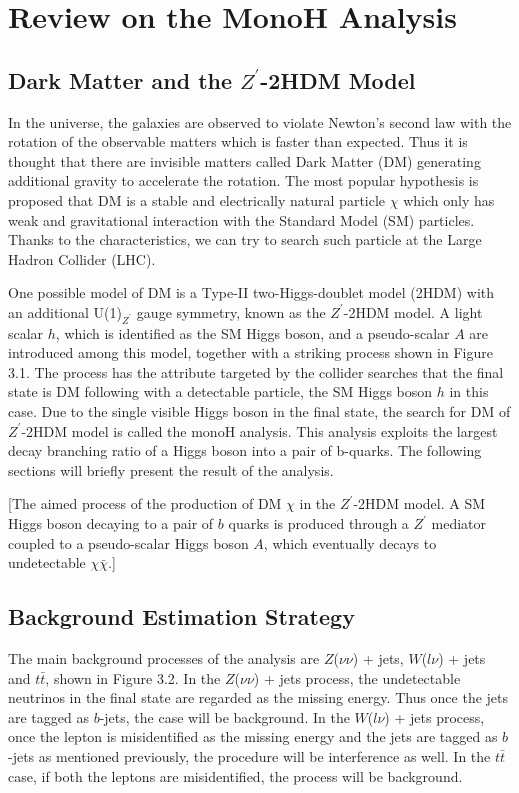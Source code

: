 \documentclass[class=NTHU_thesis, crop=false]{standalone}
\begin{document}
\chapter{Review on the MonoH Analysis}
\section{Dark Matter and the $Z^\prime$-2HDM Model}
In the universe, the galaxies are observed to violate Newton's second law with the rotation of the observable matters which is faster than expected. Thus it is thought that there are invisible matters called Dark Matter (DM) generating additional gravity to accelerate the rotation. The most popular hypothesis is proposed that DM is a stable and electrically natural particle $\chi$ which only has weak and gravitational interaction with the Standard Model (SM) particles. Thanks to the characteristics, we can try to search such particle at the Large Hadron Collider (LHC).

One possible model of DM is a Type-II two-Higgs-doublet model (2HDM) with an additional U(1)$_{Z^\prime}$ gauge symmetry, known as the $Z^\prime$-2HDM model. A light scalar $h$, which is identified as the SM Higgs boson, and a pseudo-scalar $A$ are introduced among this model, together with a striking process shown in Figure 3.1. The process has the attribute targeted by the collider searches that the final state is DM following with a detectable particle, the SM Higgs boson $h$ in this case. Due to the single visible Higgs boson in the final state, the search for DM of $Z^\prime$-2HDM model is called the monoH analysis. This analysis exploits the largest decay branching ratio of a Higgs boson into a pair of b-quarks. The following sections will briefly present the result of the analysis.

[The aimed process of the production of DM $\chi$ in the $Z^\prime$-2HDM model. A SM Higgs boson decaying to a pair of $b$ quarks is produced through a $Z^\prime$ mediator coupled to a pseudo-scalar Higgs boson $A$, which eventually decays to undetectable $\chi\bar{\chi}$.]

\section{Background Estimation Strategy}
The main background processes of the analysis are $Z$($\nu\nu$) + jets, $W$($l\nu$) + jets and $t\bar{t}$, shown in Figure 3.2. In the $Z$($\nu\nu$) + jets process, the undetectable neutrinos in the final state are regarded as the missing energy. Thus once the jets are tagged as $b$-jets, the case will be background. In the $W$($l\nu$) + jets process, once the lepton is misidentified as the missing energy and the jets are tagged as $b$-jets as mentioned previously, the procedure will be interference as well. In the $t\bar{t}$ case, if both the leptons are misidentified, the process will be background.
\end{document}
